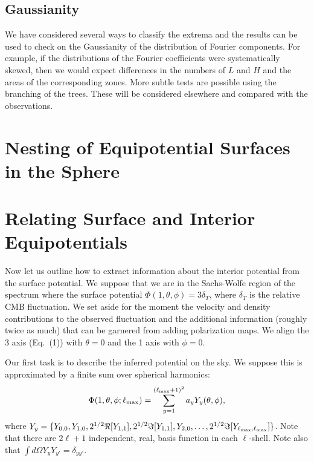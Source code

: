 \documentclass[12pt]{article}
\begin{document}
\subsection{Gaussianity}
We have considered several ways to classify the extrema and the results can be used to check on the Gaussianity of the distribution of Fourier components. For example, if the distributions of the Fourier coefficients were systematically skewed, then we would expect differences in the numbers of $L$ and $H$ and the areas of the corresponding zones. More subtle tests are possible using the branching of the trees. These will be considered elsewhere and compared with the observations.

\section{Nesting of Equipotential Surfaces in the Sphere}

\section{Relating Surface and Interior Equipotentials}
Now let us outline how to extract information about the interior potential from the surface potential. We suppose that we are in the Sachs-Wolfe region of the spectrum where the surface potential $\Phi(1,\theta,\phi)=3\delta_T$, where $\delta_T$ is the relative CMB fluctuation. We set aside for the moment the velocity and density contributions to the observed fluctuation and the additional information (roughly twice as much) that can be garnered from adding  polarization maps. We align the 3 axis (Eq.~(1)) with $\theta=0$ and the 1 axis with $\phi=0$.

Our first task is to describe the inferred potential on the sky. We suppose this is approximated by a finite sum over spherical harmonics:
\begin{equation}
\Phi(1,\theta,\phi;\ell_{\rm max})=\sum_{y=1}^{(\ell_{\rm max}+1)^2}a_yY_y(\theta,\phi),
\end{equation}
where $Y_y=\{Y_{0,0},Y_{1,0},2^{1/2}\Re[Y_{1,1}],2^{1/2}\Im[Y_{1,1}],Y_{2,0},\dots,2^{1/2}\Im[Y_{\ell_{\rm max},\ell_{\rm max}}]\}$. Note that there are $2\ell+1$ independent, real, basis function in each $\ell$-shell. Note also that $\int d\Omega Y_yY_{y'}=\delta_{yy'}$.
\end{document}
